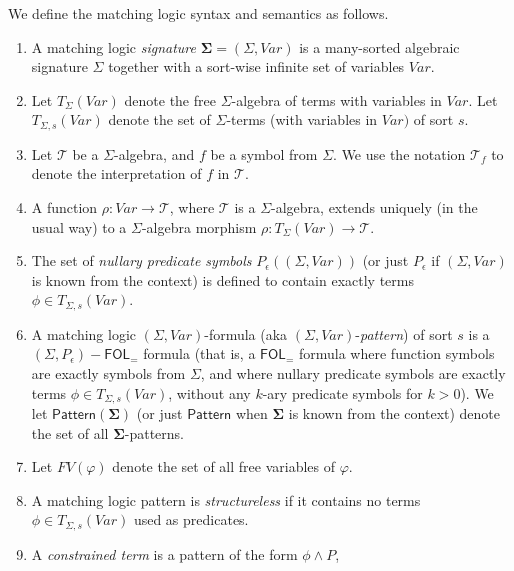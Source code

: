\documentclass{article}
\newcommand{\FOL}{\mathsf{FOL}}
\newcommand{\FOLeq}{\FOL_{=}}
\newcommand{\Pattern}{\mathsf{Pattern}}
\begin{document}
\begin{definition}\label{def:matchinglogic}
We define the matching logic syntax and semantics as follows.
\begin{enumerate}
    \item A matching logic \emph{signature} $\mathbf{\Sigma} = (\Sigma, \mathit{Var})$ is a many-sorted algebraic signature $\Sigma$ together with a sort-wise infinite set of variables $\mathit{Var}$.
    \item Let $T_{\Sigma}(\mathit{Var})$ denote the free $\Sigma$-algebra of terms with variables 
          in $\mathit{Var}$.
          Let $T_{\Sigma, s}(\mathit{Var})$ denote the set of $\Sigma$-terms (with variables in $\mathit{Var})$ of sort $s$.
    \item Let $\mathcal{T}$ be a $\Sigma$-algebra, and $f$ be a symbol from $\Sigma$.
          We use the notation $\mathcal{T}_f$ to denote the interpretation of $f$ in $\mathcal{T}$.
    \item A function $\rho : \mathit{Var} \to \mathcal{T}$, where $\mathcal{T}$ is a $\Sigma$-algebra,
          extends uniquely (in the usual way) to a $\Sigma$-algebra morphism
          $\rho : T_{\Sigma}(\mathit{Var}) \to \mathcal{T}$.
    \item The set of \emph{nullary predicate symbols} $P_\epsilon((\Sigma, \mathit{Var}))$
          (or just $P_\epsilon$ if $(\Sigma, \mathit{Var})$ is known from the context) is
          defined to contain exactly terms $\phi \in T_{\Sigma, s}(\mathit{Var})$.
    \item A matching logic $(\Sigma, \mathit{Var})$-formula (aka $(\Sigma, \mathit{Var})$-\emph{pattern})
          of sort $s$
          is a $(\Sigma, P_\epsilon)-\FOLeq$ formula (that is, a $\FOLeq$ formula where function symbols are
          exactly symbols from $\Sigma$, and where nullary predicate symbols are exactly
          terms $\phi \in T_{\Sigma, s}(\mathit{Var})$, without any $k$-ary predicate symbols for $k > 0$).
          We let $\Pattern(\mathbf{\Sigma})$ (or just $\Pattern$ when $\mathbf{\Sigma}$ is known from the context)
          denote the set of all $\mathbf{\Sigma}$-patterns.
    \item Let $\mathit{FV}(\varphi)$ denote the set of all free variables of $\varphi$.
    \item A matching logic pattern is \emph{structureless} if it contains
          no terms $\phi \in T_{\Sigma, s}(\mathit{Var})$ used as predicates.
    \item A \emph{constrained term} is a pattern of the form $\phi \land P$,

\end{enumerate}
\end{definition}
\end{document}
